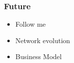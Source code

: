 \begin{frame}
\frametitle{Future}
\begin{itemize}
			\item Follow me
			\pause
			\item Network evolution
			\pause
			\item Business Model
		\end{itemize}
\end{frame}

